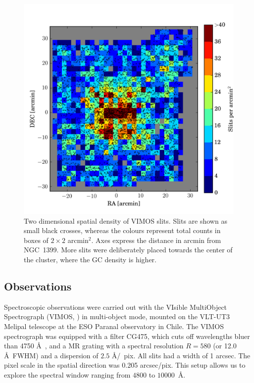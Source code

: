 \documentclass[useAMS,usenatbib]{mn2e}
\begin{document}
\begin{figure}
\centering
\includegraphics[width=\columnwidth]{figures/slitdist.png} 
\caption{Two dimensional spatial density of VIMOS slits. Slits are shown as small black crosses, whereas the colours represent total counts in boxes of $2\times2$ arcmin$^2$. Axes express the distance in arcmin from NGC~1399. More slits were deliberately placed towards the center of the cluster, where the GC density is higher. }
\label{fig:2dsplit}
\end{figure}

\subsection{Observations}
\label{sec:observations}

Spectroscopic observations were carried out with the VIsible MultiObject Spectrograph (VIMOS, \citealt{LeFevre}) in multi-object mode, mounted on the VLT-UT3 Melipal telescope at the ESO Paranal observatory in Chile. 
The VIMOS spectrograph was equipped with a filter CG475, which cuts off wavelengths bluer than 4750 \AA\ , and a MR grating with a spectral resolution $R = 580$ (or 12.0 \AA\ FWHM) and a dispersion of $2.5$ \AA /~pix. All slits had a width of 1 arcsec. The pixel scale in the spatial direction was 0.205 arcsec/pix. This setup allows us to explore the spectral window ranging from $4800$ to $10000$~\AA. 
\end{document}
